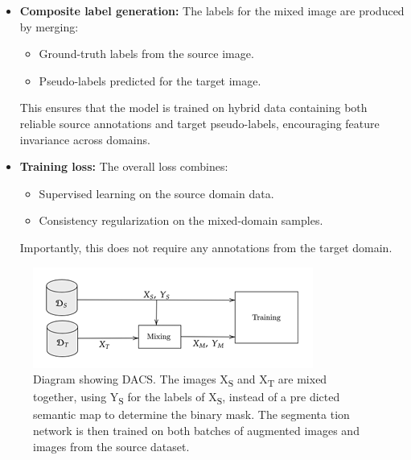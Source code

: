 \documentclass{article}
\begin{document}
\begin{multicols}{2}
\begin{itemize}
		\item \textbf{Composite label generation:}
		The labels for the mixed image are produced by merging:
		\begin{itemize}
			\item Ground-truth labels from the source image.
			\item Pseudo-labels predicted for the target image.
		\end{itemize}
		This ensures that the model is trained on hybrid data containing both reliable source annotations and target pseudo-labels, encouraging feature invariance across domains.
		

		\item \textbf{Training loss:} 
		The overall loss combines:
		\begin{itemize}
			\item Supervised learning on the source domain data.
			\item Consistency regularization on the mixed-domain samples.
		\end{itemize}
		Importantly, this does not require any annotations from the target domain.
		

	\end{itemize}

	\begin{figure}[H]
		\centering
		\includegraphics[width=1\linewidth]{image/general/DACS_structure.png}
		\caption{  Diagram showing DACS. The images X\textsubscript{S} and X\textsubscript{T} are
		mixed together, using Y\textsubscript{S} for the labels of X\textsubscript{S}, instead of a pre
	   dicted semantic map to determine the binary mask. The segmenta
	   tion network is then trained on both batches of augmented images
		and images from the source dataset.}
		\label{fig:DACS_image}
	\end{figure}	
	
		

\end{multicols}
\end{document}
